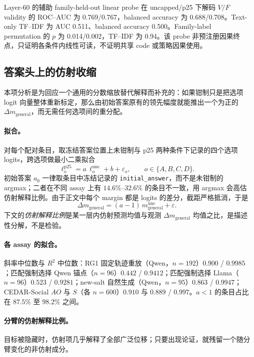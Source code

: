 \documentclass[UTF8,letterpaper,10pt,twocolumn]{ctexart}
\begin{document}
Layer-60 的辅助 family-held-out linear probe 在 uncapped/p25 下解码 $V/F$ validity 的 ROC--AUC 为 0.769/0.767，balanced accuracy 为 0.688/0.708。Text-only TF--IDF 为 AUC 0.511、balanced accuracy 0.500。Family-label permutation 的 $p$ 为 0.014/0.002，TF--IDF 为 0.94。该 probe 非预注册因果终点，只证明各条件内线性可读，不证明共享 code 或策略因果使用。

\subsection{答案头上的仿射收缩}
\label{supp:contraction-zh}

本项分析是为回应一个通用的分数缩放替代解释而补充的：如果钳制只是把选项 logit 向量整体重新标定，那么由初始答案原有的领先幅度就能推出一个为正的 $\Delta m_{\mathrm{general}}$，而无需任何选项间的重分配。

\paragraph{拟合。}
对每个配对条目，取冻结答案位置上未钳制与 p25 两种条件下记录的四个选项 logits，跨选项做最小二乘拟合
\begin{equation}
\ell^{\mathrm{p25}}_{o}=a\,\ell^{\mathrm{unc}}_{o}+b+\varepsilon_{o},\qquad o\in\{A,B,C,D\}.
\end{equation}
初始答案 $a_0$ 一律取条目中冻结记录的 \texttt{initial\_answer}，而不是未钳制的 argmax；二者在不同 assay 上有 $14.6\%$--$32.6\%$ 的条目不一致，用 argmax 会高估仿射解释比例。由于正文中每个 margin 都是 logits 的差分，截距严格抵消，于是
\begin{equation}
\Delta m_{\mathrm{general}}=(a-1)\,m^{\mathrm{unc}}_{\mathrm{general}}+\varepsilon .
\end{equation}
下文的\emph{仿射解释比例}是某一层内仿射预测均值与观测 $\Delta m_{\mathrm{general}}$ 均值之比，是描述性分解，不是检验。

\paragraph{各 assay 的拟合。}
斜率中位数与 $R^{2}$ 中位数：RG1 固定轨迹重放（Qwen，$n=192$）$0.900$ / $0.9985$；匹配强制选择 Qwen 锚点（$n=96$）$0.442$ / $0.9412$；匹配强制选择 Llama（$n=96$）$0.523$ / $0.9281$；new-salt 自然生成（Qwen，$n=95$）$0.863$ / $0.9947$；CEDAR-Social $AO$ 与 $S$（各 $n=600$）$0.910$ 与 $0.889$ / $0.997$。$a<1$ 的条目占比在 $87.5\%$ 至 $98.2\%$ 之间。

\paragraph{分臂的仿射解释比例。}
目标被隐藏时，仿射项几乎解释了全部广泛位移；只要出现论证，就残留一个随分臂变化的非仿射成分。
\end{document}
